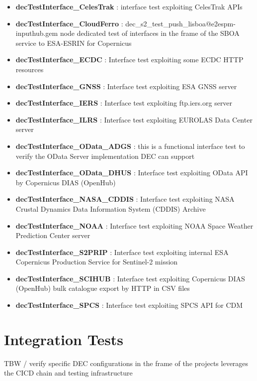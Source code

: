 \documentclass[dec_sum_main.tex]{subfiles}
\begin{document}
\begin{itemize}
    \item \textbf{decTestInterface\_CelesTrak} : interface test exploiting CelesTrak APIs
     \item \textbf{decTestInterface\_CloudFerro} : dec\_s2\_test\_push\_lisboa@e2espm-inputhub.gem node dedicated test of interfaces in the frame of the SBOA service to ESA-ESRIN for Copernicus
     \item \textbf{decTestInterface\_ECDC} : Interface test exploiting some ECDC HTTP resources
     \item \textbf{decTestInterface\_GNSS} : Interface test exploiting ESA GNSS server
     \item \textbf{decTestInterface\_IERS} : Interface test exploiting ftp.iers.org  server
     \item \textbf{decTestInterface\_ILRS} : Interface test exploiting EUROLAS Data Center server
     \item \textbf{decTestInterface\_OData\_ADGS} : this is a functional interface test to verify the OData Server implementation DEC can support
     \item \textbf{decTestInterface\_OData\_DHUS} : Interface test exploiting OData API by Copernicus DIAS (OpenHub)
     \item \textbf{decTestInterface\_NASA\_CDDIS} : Interface test exploiting NASA Crustal Dynamics Data Information System (CDDIS) Archive
     \item \textbf{decTestInterface\_NOAA} : Interface test exploiting NOAA Space Weather Prediction Center server
     \item \textbf{decTestInterface\_S2PRIP} : Interface test exploiting internal ESA Copernicus Production Service for Sentinel-2 mission
     \item \textbf{decTestInterface\_SCIHUB} : Interface test exploiting Copernicus DIAS (OpenHub) bulk catalogue export by HTTP in CSV files
     \item \textbf{decTestInterface\_SPCS} : Interface test exploiting SPCS API for CDM     
\end{itemize}



\section{Integration Tests}
TBW / verify specific DEC configurations in the frame of the projects 
leverages the CICD chain and testing infrastructure
\end{document}
